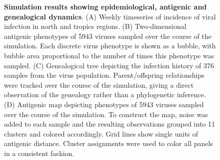 \documentclass[11pt,oneside,letterpaper]{article}
\begin{document}
\begin{figure}[tb]
	\centering
	\caption{\textbf{Simulation results showing epidemiological, antigenic and genealogical dynamics}. (A) Weekly timeseries of incidence of viral infection in north and tropics regions.  (B) Two-dimensional antigenic phenotypes of 5943 viruses sampled over the course of the simulation. Each discrete virus phenotype is shown as a bubble, with bubble area proportional to the number of times this phenotype was sampled.  (C) Genealogical tree depicting the infection history of 376 samples from the virus population.  Parent/offspring relationships were tracked over the course of the simulation, giving a direct observation of the genealogy rather than a phylogenetic inference.  (D) Antigenic map depicting phenotypes of 5943 viruses sampled over the course of the simulation.  To construct the map, noise was added to each sample and the resulting observations grouped into 11 clusters and colored accordingly.  Grid lines show single units of antigenic distance.  Cluster assignments were used to color all panels in a consistent fashion.}
	\label{evol}
\end{figure}
\end{document}
